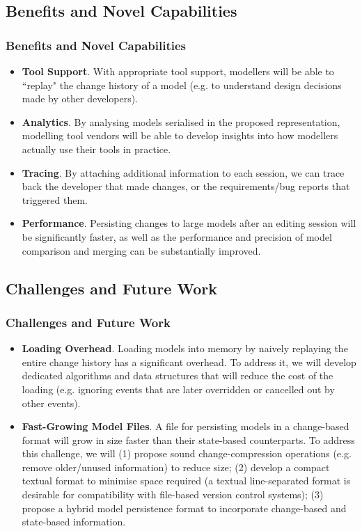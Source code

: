 \documentclass{beamer}
\begin{document}
\begin{frame}
\section{Benefits and Novel Capabilities}
\frametitle{Benefits and Novel Capabilities}
\begin{itemize}
\item \textbf{Tool Support}. With appropriate tool support, modellers will be able to ``replay" the change history of a model (e.g. to understand design decisions made by other developers). 
\item \textbf{Analytics}. By analysing models serialised in the proposed representation, modelling tool vendors will be able to develop insights into how modellers actually use their tools in practice.
\item \textbf{Tracing}. By attaching additional information to each session, we can trace back the developer that made changes, or the requirements/bug reports that triggered them.
\item \textbf{Performance}. Persisting changes to large models after an editing session will be significantly faster, as well as the performance and precision of model comparison and merging can be substantially improved.
\end{itemize}
\end{frame}

\begin{frame}
\section{Challenges and Future Work}
\frametitle{Challenges and Future Work}
\begin{itemize}
\item \textbf{Loading Overhead}. Loading models into memory by naively replaying the entire change history has a significant overhead. To address it, we will develop dedicated algorithms and data structures that will reduce the cost of the loading (e.g. ignoring events that are later overridden or cancelled out by other events). 

\item \textbf{Fast-Growing Model Files}. A file for persisting models in a change-based format will grow in size faster than their state-based counterparts. To address this challenge, we will (1) propose sound change-compression operations (e.g. remove older/unused information) to reduce size; (2) develop a compact textual format to minimise space required (a textual line-separated format is desirable for compatibility with file-based version control systems); (3) propose a hybrid model persistence format to incorporate change-based and state-based information. 
\end{itemize}
\end{frame}
\end{document}
